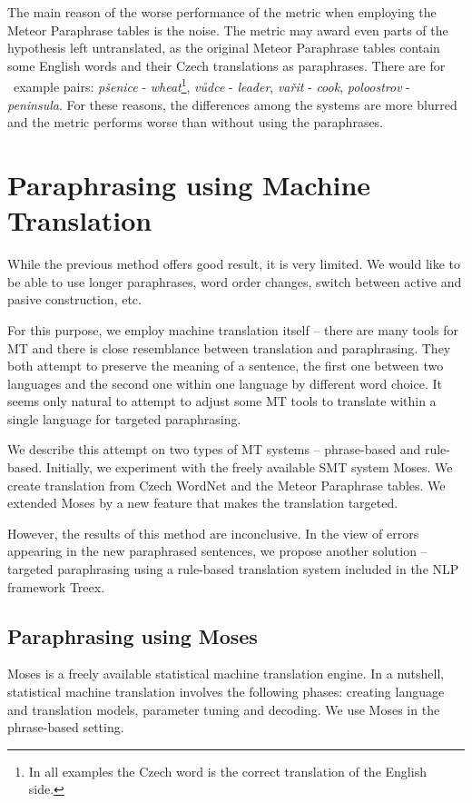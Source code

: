 \documentclass[11pt]{article}
\begin{document}
The main reason of the worse performance of the metric when employing the 
Meteor Paraphrase tables is the noise. The metric may award even parts of the 
hypothesis left untranslated, as the original Meteor Paraphrase tables contain 
some English words and their Czech translations as paraphrases. There are for
~example pairs: \textit{pšenice} - \textit{wheat}\footnote{In all examples the 
Czech word is the correct translation of the English side.}, \textit{vůdce} - 
\textit{leader}, \textit{vařit} -	\textit{cook}, \textit{poloostrov} - 
\textit{peninsula}. For these reasons, the differences among the systems are 
more blurred and the metric performs worse than without using the paraphrases. 

\section{Paraphrasing using Machine Translation}
\label{MT}
While the previous method offers good result, it is very limited. We would like
to be able to use longer paraphrases, word order changes, switch between active 
and pasive construction, etc.

For this purpose, we employ machine translation itself -- there are many tools 
for MT and there is close resemblance between translation and paraphrasing. 
They both attempt to preserve the meaning of a sentence, the first one between 
two languages and the second one within one language by different word choice. 
It seems only natural to attempt to adjust some MT tools to translate within a 
single language for targeted paraphrasing. 

We describe this attempt on two types of MT systems -- phrase-based and 
rule-based. Initially, we experiment with the freely available SMT system 
Moses. \cite{moses} We create translation from Czech WordNet and the Meteor 
Paraphrase tables. We extended Moses by a new feature that makes the 
translation targeted. 

However, the results of this method are inconclusive. In the view of errors 
appearing in the new paraphrased sentences, we propose another solution -- 
targeted paraphrasing using a rule-based translation system included in the NLP 
framework Treex. \cite{treex}

\subsection{Paraphrasing using Moses}
Moses is a freely available statistical machine translation engine. In a 
nutshell, statistical machine translation involves the following phases: 
creating language and translation models, parameter tuning and decoding. We use 
Moses in the phrase-based setting.
\end{document}
